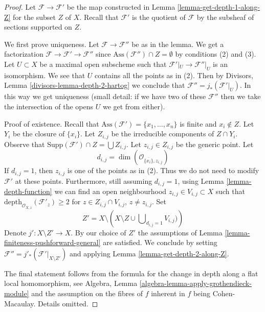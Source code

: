 \documentclass{stacks-project}
\theoremstyle{plain}
\theoremstyle{definition}
\theoremstyle{remark}
\numberwithin{equation}{subsection}
\begin{document}
\begin{proof}
Let $\mathcal{F} \to \mathcal{F}'$ be the map constructed in
Lemma \ref{lemma-get-depth-1-along-Z} for the subset $Z$ of $X$.
Recall that $\mathcal{F}'$ is the quotient of $\mathcal{F}$
by the subsheaf of sections supported on $Z$.

\medskip\noindent
We first prove uniqueness. Let $\mathcal{F} \to \mathcal{F}''$
be as in the lemma. We get a factorization
$\mathcal{F} \to \mathcal{F}' \to \mathcal{F}''$
since $\text{Ass}(\mathcal{F}'') \cap Z = \emptyset$
by conditions (2) and (3). Let $U \subset X$ be a maximal open
subscheme such that $\mathcal{F}'|_U \to \mathcal{F}''|_U$
is an isomorphism. We see that $U$ contains all the points
as in (2). Then by Divisors, Lemma \ref{divisors-lemma-depth-2-hartog}
we conclude that $\mathcal{F}'' = j_*(\mathcal{F}'|_U)$.
In this way we get uniqueness (small detail: if we have two
of these $\mathcal{F}''$ then we take the intersection of the opens $U$
we get from either).

\medskip\noindent
Proof of existence. Recall that
$\text{Ass}(\mathcal{F}') = \{x_1, \ldots, x_n\}$
is finite and $x_i \not \in Z$.
Let $Y_i$ be the closure of $\{x_i\}$. Let
$Z_{i, j}$ be the irreducible components of $Z \cap Y_i$.
Observe that $\text{Supp}(\mathcal{F}') \cap Z = \bigcup Z_{i, j}$.
Let $z_{i, j} \in Z_{i, j}$ be the generic point.
Let
$$
d_{i, j} = \dim(\mathcal{O}_{\overline{\{x_i\}}, z_{i, j}})
$$
If $d_{i, j} = 1$, then $z_{i, j}$ is one of the points as in (2).
Thus we do not need to modify $\mathcal{F}'$ at these points.
Furthermore, still assuming $d_{i, j} = 1$, using
Lemma \ref{lemma-depth-function}
we can find an open neighbourhood
$z_{i, j} \in V_{i, j} \subset X$ such that
$\text{depth}_{\mathcal{O}_{X, z}}(\mathcal{F}'_z) \geq 2$
for $z \in Z_{i, j} \cap V_{i, j}$, $z \not = z_{i, j}$.
Set
$$
Z' = X \setminus
\left(
X \setminus Z \cup \bigcup\nolimits_{d_{i, j} = 1} V_{i, j})
\right)
$$
Denote $j' : X \setminus Z' \to X$. By our choice of $Z'$
the assumptions of Lemma \ref{lemma-finiteness-pushforward-general}
are satisfied.
We conclude by setting $\mathcal{F}'' = j'_*(\mathcal{F}'|_{X \setminus Z'})$
and applying Lemma \ref{lemma-get-depth-2-along-Z}.

\medskip\noindent
The final statement follows from the formula for the change in
depth along a flat local homomorphism, see
Algebra, Lemma \ref{algebra-lemma-apply-grothendieck-module}
and the assumption on the fibres of $f$ inherent in $f$ being
Cohen-Macaulay. Details omitted.
\end{proof}
\end{document}
